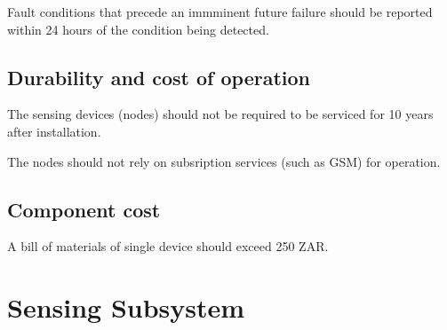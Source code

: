 \documentclass[12pt]{article}
\begin{document}
Fault conditions that  precede an immminent future failure should be reported within 24 hours of the condition being
detected.

\subsection{Durability and cost of operation}
The sensing devices (nodes) should not be required to be serviced for 10 years after installation.

The nodes should not rely on subsription services (such as GSM) for operation.

\subsection{Component cost}
A bill of materials of single device should exceed 250 ZAR.

\newpage
\section{Sensing Subsystem} 
\end{document}
